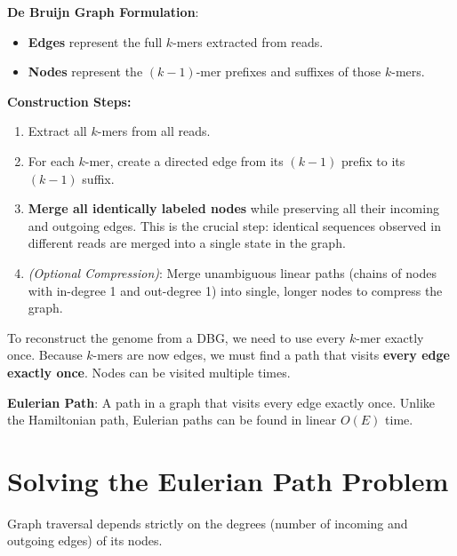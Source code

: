 \documentclass[11pt, a4paper]{article}
\begin{document}
\begin{important}
    \textbf{De Bruijn Graph Formulation}:
    \begin{itemize}
        \item \textbf{Edges} represent the full $k$-mers extracted from reads.
        \item \textbf{Nodes} represent the $(k-1)$-mer prefixes and suffixes of those $k$-mers.
    \end{itemize}
\end{important}

\textbf{Construction Steps:}
\begin{enumerate}
    \item Extract all $k$-mers from all reads.
    \item For each $k$-mer, create a directed edge from its $(k-1)$ prefix to its $(k-1)$ suffix.
    \item \textbf{Merge all identically labeled nodes} while preserving all their incoming and outgoing edges. This is the crucial step: identical sequences observed in different reads are merged into a single state in the graph.
    \item \textit{(Optional Compression)}: Merge unambiguous linear paths (chains of nodes with in-degree 1 and out-degree 1) into single, longer nodes to compress the graph.
\end{enumerate}


To reconstruct the genome from a DBG, we need to use every $k$-mer exactly once. Because $k$-mers are now edges, we must find a path that visits \textbf{every edge exactly once}. Nodes can be visited multiple times.

\begin{important}
    \textbf{Eulerian Path}: A path in a graph that visits every edge exactly once. Unlike the Hamiltonian path, Eulerian paths can be found in linear $O(E)$ time.
\end{important}

\section{Solving the Eulerian Path Problem}
Graph traversal depends strictly on the degrees (number of incoming and outgoing edges) of its nodes.
\end{document}
